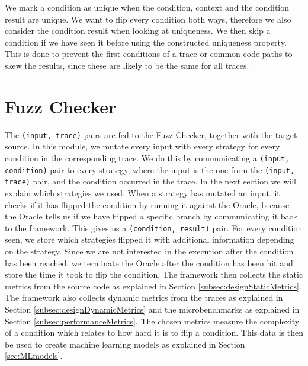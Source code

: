 We mark a condition as unique when the condition, context and the condition result are unique. We want to flip every condition both ways, therefore we also consider the condition result when looking at uniqueness. We then skip a condition if we have seen it before using the constructed uniqueness property. This is done to prevent the first conditions of a trace or common code paths to skew the results, since these are likely to be the same for all traces.


\section{Fuzz Checker}
The \texttt{(input, trace)} pairs are fed to the Fuzz Checker, together with the target source. In this module, we mutate every input with every strategy for every condition in the corresponding trace. We do this by communicating a \texttt{(input, condition)} pair to every strategy, where the input is the one from the \texttt{(input, trace)} pair, and the condition occurred in the trace. In the next section we will explain which strategies we used. When a strategy has mutated an input, it checks if it has flipped the condition by running it against the Oracle, because the Oracle tells us if we have flipped a specific branch by communicating it back to the framework. This gives us a \texttt{(condition, result)} pair. For every condition seen, we store which strategies flipped it with additional information depending on the strategy. Since we are not interested in the execution after the condition has been reached, we terminate the Oracle after the condition has been hit and store the time it took to flip the condition. The framework then collects the static metrics from the source code as explained in Section \ref{subsec:designStaticMetrics}. The framework also collects dynamic metrics from the traces as explained in Section \ref{subsec:designDynamicMetrics} and the microbenchmarks as explained in Section \ref{subsec:performanceMetrics}. The chosen metrics measure the complexity of a condition which relates to how hard it is to flip a condition. This data is then be used to create machine learning models as explained in Section \ref{sec:MLmodels}. 


